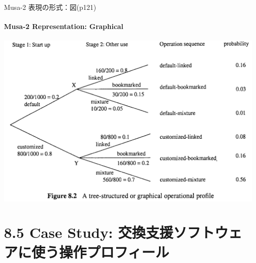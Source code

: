 \begin{frame}{Musa-2 表現の形式：図(p121)}
\framesubtitle{Musa-2 Representation: Graphical}
\begin{center}
\includegraphics[width=\textwidth,height=0.8\textheight,keepaspectratio]{figure/graphical.png}
\end{center}
\end{frame}
\section{8.5 Case Study: 交換支援ソフトウェアに使う操作プロフィール}
